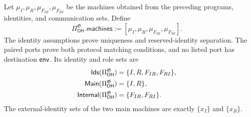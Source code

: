 \begin{definition}
\label{def:dhke-real-protocol}
\notready
Let \(\mu_I,\mu_R,\mu_{F_{IR}},\mu_{F_{RI}}\) be the machines obtained from
the preceding programs, identities, and communication sets.  Define
\[
  \Pi_{\mathsf{DH}}^{\mathfrak G}.\mathsf{machines}
  :=[\mu_I,\mu_R,\mu_{F_{IR}},\mu_{F_{RI}}].
\]
The identity assumptions prove uniqueness and reserved-identity separation.
The paired ports prove both protocol matching conditions, and no listed port
has destination \(\mathsf{env}\).  Its identity and role sets are
\[
\begin{aligned}
  \mathsf{Ids}(\Pi_{\mathsf{DH}}^{\mathfrak G})
    &=\{I,R,F_{IR},F_{RI}\},\\
  \mathsf{Main}(\Pi_{\mathsf{DH}}^{\mathfrak G})
    &=\{I,R\},\\
  \mathsf{Internal}(\Pi_{\mathsf{DH}}^{\mathfrak G})
    &=\{F_{IR},F_{RI}\}.
\end{aligned}
\]
The external-identity sets of the two main machines are exactly
\(\{x_I\}\) and \(\{x_R\}\).
\end{definition}

